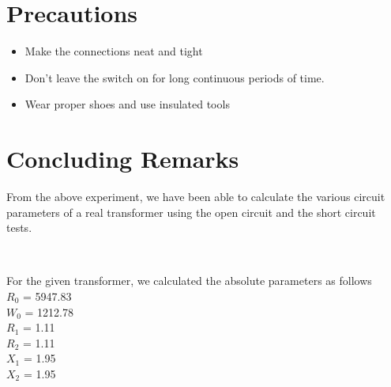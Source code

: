 \documentclass{article}
\begin{document}
\vspace{5px}

\section{Precautions}

\begin{itemize}
\item Make the connections neat and tight
\item Don’t leave the switch on for long continuous periods of time.
\item Wear proper shoes and use insulated tools
\end{itemize}

\vspace{5px}

\section{Concluding Remarks}
From the above experiment, we have been able to calculate the various circuit parameters of a real transformer using the open circuit and the short circuit tests.

\vspace{10px}
\begin{center}
 \\ \vspace{5px}
\end{center}

For the given transformer, we calculated the absolute parameters as follows \\
$R_0$ = 5947.83 \\
$W_0$ = 1212.78 \\
$R_1$ = 1.11 \\
$R_2$ = 1.11 \\
$X_1$ = 1.95 \\
$X_2$ = 1.95 \\
\end{document}
